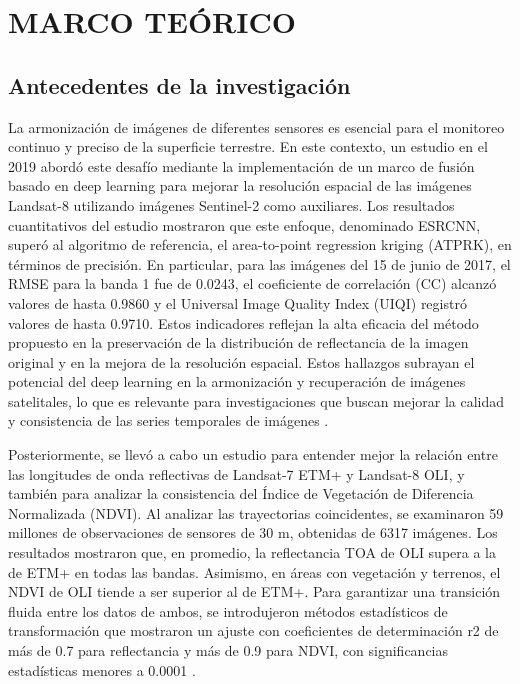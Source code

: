 \Chapter{}
\chapter{MARCO TEÓRICO}
   \section{Antecedentes de la investigación}
        La armonización de imágenes de diferentes sensores es esencial para el monitoreo continuo y preciso de la superficie terrestre. En este contexto, un estudio en el 2019 abordó este desafío mediante la implementación de un marco de fusión basado en deep learning para mejorar la resolución espacial de las imágenes Landsat-8 utilizando imágenes Sentinel-2 como auxiliares. Los resultados cuantitativos del estudio mostraron que este enfoque, denominado ESRCNN, superó al algoritmo de referencia, el area-to-point regression kriging (ATPRK), en términos de precisión. En particular, para las imágenes del 15 de junio de 2017, el RMSE para la banda 1 fue de 0.0243, el coeficiente de correlación (CC) alcanzó valores de hasta 0.9860 y el Universal Image Quality Index (UIQI) registró valores de hasta 0.9710. Estos indicadores reflejan la alta eficacia del método propuesto en la preservación de la distribución de reflectancia de la imagen original y en la mejora de la resolución espacial. Estos hallazgos subrayan el potencial del deep learning en la armonización y recuperación de imágenes satelitales, lo que es relevante para investigaciones que buscan mejorar la calidad y consistencia de las series temporales de imágenes \autocite{shao2019deep}.

        Posteriormente, se llevó a cabo un estudio para entender mejor la relación entre las longitudes de onda reflectivas de Landsat-7 ETM+ y Landsat-8 OLI, y también para analizar la consistencia del Índice de Vegetación de Diferencia Normalizada (NDVI). Al analizar las trayectorias coincidentes, se examinaron 59 millones de observaciones de sensores de 30 m, obtenidas de 6317 imágenes. Los resultados mostraron que, en promedio, la reflectancia TOA de OLI supera a la de ETM+ en todas las bandas. Asimismo, en áreas con vegetación y terrenos, el NDVI de OLI tiende a ser superior al de ETM+. Para garantizar una transición fluida entre los datos de ambos, se introdujeron métodos estadísticos de transformación que mostraron un ajuste con coeficientes de determinación r2 de más de 0.7 para reflectancia y más de 0.9 para NDVI, con significancias estadísticas menores a 0.0001 \autocite{roy2016characterization}.
        
